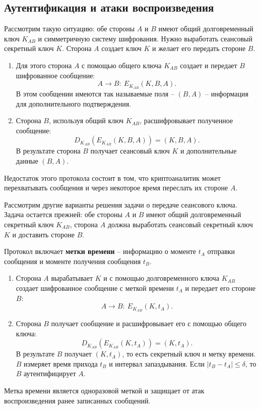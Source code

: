 \documentclass[10pt,a4paper]{book}
\begin{document}
\subsection{Аутентификация и атаки воспроизведения}

Рассмотрим такую ситуацию: обе стороны $A$ и $B$ имеют общий долговременный ключ $K_{AB}$ и симметричную систему шифрования. Нужно выработать сеансовый секретный ключ $K$. Сторона $A$ создает ключ $K$ и желает его передать стороне $B$.

\begin{enumerate}
    \item Для этого сторона $A$ с помощью общего ключа $K_{AB}$ создает и передает $B$ шифрованное сообщение:
            \[ A \rightarrow B: ~ E_{K_{AB}}(K, B, A). \]
        В этом сообщении имеются так называемые поля -- $(B,A)$ -- информация для дополнительного подтверждения.
    \item Сторона $B$, используя общий ключ $K_{AB}$, расшифровывает полученное сообщение:
            \[ D_{K_{AB}}( E_{K_{AB}}( K, B, A)) = (K, B, A). \]
        В результате сторона $B$ получает сеансовый ключ $K$ и дополнительные данные $(B,A)$.
\end{enumerate}

Недостаток этого протокола состоит в том, что криптоаналитик может перехватывать сообщения и через некоторое время переслать их стороне $A$.

Рассмотрим другие варианты решения задачи о передаче сеансового ключа.
Задача остается прежней: обе стороны $A$ и $B$ имеют общий долговременный секретный ключ $K_{AB}$, сторона $A$ должна выработать сеансовый секретный ключ $K$ и доставить стороне $B$.

Протокол включает \textbf{метки времени} -- информацию о моменте $t_A$ отправки сообщения и моменте получения сообщения $t_B$.

\begin{enumerate}
    \item Сторона $A$ вырабатывает $K$ и с помощью долговременного ключа $K_{AB}$ создает шифрованное сообщение с меткой времени $t_A$ и передает его стороне $B$:
            \[ A \rightarrow B: ~ E_{K_{AB}}(K, t_A). \]
    \item Сторона $B$ получает сообщение и расшифровывает его с помощью общего ключа:
            \[ D_{K_{AB}}( E_{K_{AB}}( K, t_A)) = (K, t_A). \]
        В результате $B$ получает $(K, t_A)$, то есть секретный ключ и метку времени. $B$ измеряет время прихода $t_B$ и интервал запаздывания. Если $|t_B - t_A| \le \delta$, то $B$ аутентифицирует $A$.
\end{enumerate}
Метка времени является одноразовой меткой и защищает от атак воспроизведения ранее записанных сообщений.
\end{document}

